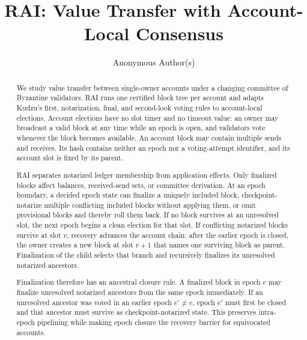 \documentclass[10pt,twocolumn]{article}
\title{\vspace{-1.1cm}\textbf{RAI: Value Transfer with Account-Local Consensus}}
\author{Anonymous Author(s)}
\date{}
\begin{document}
\maketitle
\vspace{-0.7em}

\begin{abstract}
We study value transfer between single-owner accounts under a changing committee of Byzantine validators. RAI runs one certified block tree per account and adapts Kudzu's first, notarization, final, and second-look voting rules to account-local elections. Account elections have no slot timer and no timeout value: an owner may broadcast a valid block at any time while an epoch is open, and validators vote whenever the block becomes available. An account block may contain multiple sends and receives. Its hash contains neither an epoch nor a voting-attempt identifier, and its account slot is fixed by its parent.

RAI separates notarized ledger membership from application effects. Only finalized blocks affect balances, received-send sets, or committee derivation. At an epoch boundary, a decided epoch state can finalize a uniquely included block, checkpoint-notarize multiple conflicting included blocks without applying them, or omit provisional blocks and thereby roll them back. If no block survives at an unresolved slot, the next epoch begins a clean election for that slot. If conflicting notarized blocks survive at slot $v$, recovery advances the account chain: after the earlier epoch is closed, the owner creates a new block at slot $v+1$ that names one surviving block as parent. Finalization of the child selects that branch and recursively finalizes its unresolved notarized ancestors.

Finalization therefore has an ancestral closure rule. A finalized block in epoch $e$ may finalize unresolved notarized ancestors from the same epoch immediately. If an unresolved ancestor was voted in an earlier epoch $e'\ne e$, epoch $e'$ must first be closed and that ancestor must survive as checkpoint-notarized state. This preserves intra-epoch pipelining while making epoch closure the recovery barrier for equivocated accounts.


\end{abstract}
\end{document}
